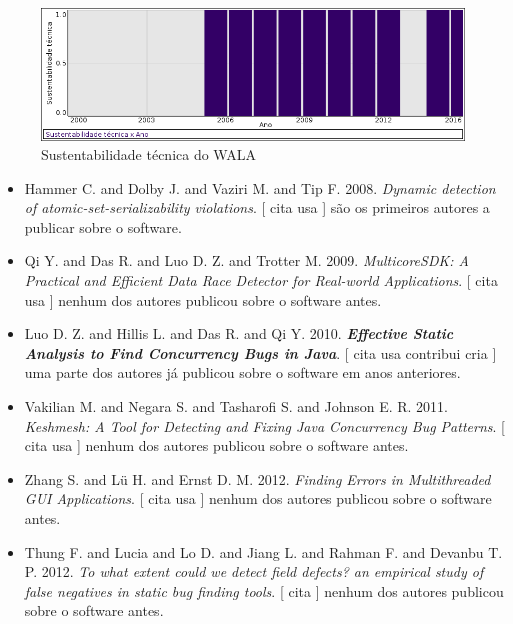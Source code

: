\begin{figure}[h]
  \center
  \includegraphics[scale=0.50]{result-documents/charts/wala.png}
  \caption{Sustentabilidade técnica do WALA}
\end{figure}


\begin{itemize}
\item Hammer C. and Dolby J. and Vaziri M. and Tip F.
      2008.
        \textit{ Dynamic detection of atomic-set-serializability violations}.
      [
          cita
          usa
      ]
são os primeiros autores a publicar sobre o software.
\item Qi Y. and Das R. and Luo D. Z. and Trotter M.
      2009.
        \textit{ MulticoreSDK: A Practical and Efficient Data Race Detector for Real-world Applications}.
      [
          cita
          usa
      ]
nenhum dos autores publicou sobre o software antes.
\item Luo D. Z. and Hillis L. and Das R. and Qi Y.
      2010.
        \textbf{\textit{ Effective Static Analysis to Find Concurrency Bugs in Java}}.
      [
          cita
          usa
          contribui
          cria
      ]
uma parte dos autores já publicou sobre o software em anos anteriores.
\item Vakilian M. and Negara S. and Tasharofi S. and Johnson E. R.
      2011.
        \textit{ Keshmesh: A Tool for Detecting and Fixing Java Concurrency Bug Patterns}.
      [
          cita
          usa
      ]
nenhum dos autores publicou sobre o software antes.
\item Zhang S. and L\"{u} H. and Ernst D. M.
      2012.
        \textit{ Finding Errors in Multithreaded GUI Applications}.
      [
          cita
          usa
      ]
nenhum dos autores publicou sobre o software antes.
\item Thung F. and Lucia and Lo D. and Jiang L. and Rahman F. and Devanbu T. P.
      2012.
        \textit{ To what extent could we detect field defects? an empirical study of false negatives in static bug finding tools}.
      [
          cita
      ]
nenhum dos autores publicou sobre o software antes.

\end{itemize}
